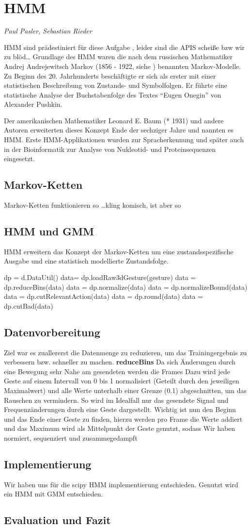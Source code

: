 ﻿\section{\acl{HMM}}
\textit{Paul Pasler, Sebastian Rieder}

\acl{HMM} sind prädestiniert für diese Aufgabe \cite{mmmFink}, leider sind die APIS scheiße bzw wir zu blöd\ldots
\cite{rabiner}
Grundlage des \acl{HMM} waren die nach dem russischen Mathematiker Andrej Andrejewitsch Markov 
(1856 - 1922, siehe \cite{wiki:markov}) benannten Markov-Modelle. Zu Beginn des 20. Jahrhunderts 
beschäftigte er sich als erster mit einer statistischen Beschreibung von Zustands- und Symbolfolgen. 
Er führte eine statistische Analyse der Buchstabenfolge des Textes ``Eugen Onegin'' von Alexander 
Pushkin.

Der amerikanischen Mathematiker Leonard E. Baum (* 1931) und andere Autoren erweiterten dieses Konzept Ende der 
sechziger Jahre und nannten es \acl{HMM}. Erste \acl{HMM}-Applikationen wurden zur Spracherkennung und später auch in der Bioinformatik 
zur Analyse von Nukleotid- und Proteinsequenzen eingesetzt. 
 
\subsection{Markov-Ketten}
Markov-Ketten funktionieren so \ldots kling komisch, ist aber so


\subsection{\acl{HMM} und \acl{GMM}}
\acl{HMM} erweitern das Konzept der Markov-Ketten um eine zustandsspezifische Ausgabe und eine statistisch 
modellierte Zustandsfolge.

    dp = d.DataUtil()
    data= dp.loadRaw3dGesture(gesture)
    data = dp.reduceBins(data)
    data = dp.normalize(data)
    data = dp.normalizeBound(data)
    data = dp.cutRelevantAction(data)
    data = dp.round(data)
    data = dp.cutBad(data)
\subsection{Datenvorbereitung}
Ziel war es zuallererst die Datenmenge zu reduzieren, um das Trainingergebnis zu verbessern bzw. schneller zu machen.
\textbf{reduceBins} Da sich Änderungen durch eine Bewegung sehr Nahe am gesendeten werden die Frames  
Dazu wird jede Geste auf einem Intervall von 0 bis 1 normalisiert (Geteilt durch den jeweiligen Maximalwert) 
und alle Werte unterhalb einer Grenze (0.1) abgeschnitten, um das Rauschen zu vermindern. 
So wird im Idealfall nur das gesendete Signal und Frequenzänderungen durch eine Geste dargestellt.
Wichtig ist nun den Beginn und das Ende einer Geste zu finden, hierzu werden pro Frame die Werte addiert 
und das Maximum wird als Mittelpunkt der Geste genutzt, sodass  
Wir haben normiert, sequenziert und zusammegedampft


\subsection{Implementierung}
Wir haben uns für die scipy HMM implementierung entschieden. 
Genutzt wird ein \acl{HMM} mit \acl{GMM} entschieden.


\subsection{Evaluation und Fazit}
